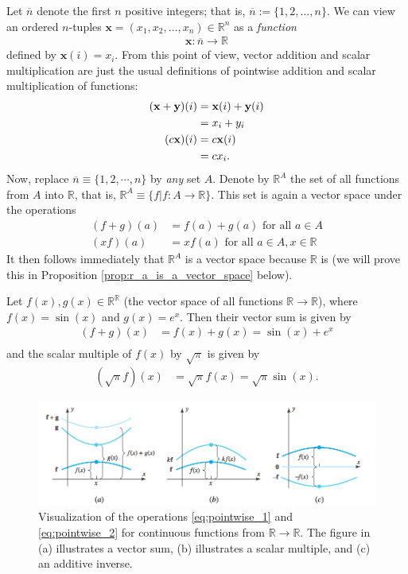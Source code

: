 \documentclass[12pt,letterpaper,reqno]{article}
\numberwithin{equation}{section}
\begin{document}
Let $\overline{n}$ denote the first $n$ positive integers; that is, $\overline{n}:=\{1,2,\dots,n\}$. We can view an ordered $n$-tuples $\mathbf{x}=(x_1,x_2,\dots,x_n) \in \mathbb{R}^n$ as a \emph{function} 
\begin{align*}
	\mathbf{x}:\overline{n} \to \mathbb{R}
\end{align*}
defined by $\mathbf{x}(i)=x_i$. From this point of view, vector addition and scalar multiplication are just the usual definitions of pointwise addition and scalar multiplication of functions:
\begin{align*}
	({\bf x}+{\bf y})(i)&={\bf x}(i)+{\bf y}(i) \\
	&=x_i+y_i \\
	(c{\bf x})(i)&=c{\bf x}(i) \\
	&=cx_i.
\end{align*}
Now, replace $\overline{n}\equiv \{1,2,\cdots,n\}$ by \emph{any} set $A$.
	Denote by $\mathbb{R}^A$ the set of all functions from $A$ into $\mathbb{R}$, that is, $\mathbb{R}^A\equiv \{f|f:A \to \mathbb{R}\}$. This set is again a vector space under the operations
 \begin{align}\label{eq:pointwise_1}
	(f+g)(a)&=f(a)+g(a) \text{ for all } a \in A\\ \label{eq:pointwise_2}
	(xf)(a)&=xf(a) \text{ for all } a \in A, x \in \mathbb{R} 
\end{align}
It then follows immediately that $\mathbb{R}^A$ is a vector space because $\mathbb{R}$ is (we will prove this in Proposition \ref{prop:r_a_is_a_vector_space} below).

\begin{example}
Let $f(x), g(x) \in \mathbb{R}^\mathbb{R}$ (the vector space of all functions $\mathbb{R} \to \mathbb{R}$), where $f(x)=\sin(x)$ and $g(x)=e^x$. Then their vector sum is given by
\begin{align*}
	(f+g)(x)&=f(x)+g(x)=\sin(x)+e^x \\
\end{align*}
and the scalar multiple of $f(x)$ by $\sqrt{\pi}$ is given by
\begin{align*}
	(\sqrt{\pi}f)(x)&=\sqrt{\pi}f(x)=\sqrt{\pi}\sin(x).
\end{align*}	
\end{example}

\begin{figure}[h]
	\begin{center}
	\includegraphics[scale=0.5]{figures_mvc/function_operations}
\end{center}
\caption{Visualization of the operations \eqref{eq:pointwise_1} and \eqref{eq:pointwise_2} for continuous functions from $\mathbb{R} \to \mathbb{R}$. The figure in (a) illustrates a vector sum, (b) illustrates a scalar multiple, and (c) an additive inverse.}
\end{figure}
\end{document}
